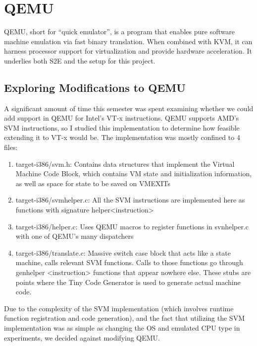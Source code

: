 \documentclass[11pt]{article}
\begin{document}
\section{QEMU}
QEMU, short for ``quick emulator'', is a program that enables pure software
machine emulation via fast binary translation. When combined with KVM, it can
harness processor support for virtualization and provide hardware
acceleration. It underlies both S2E and the setup for this project.
\subsection{Exploring Modifications to QEMU}
A significant amount of time this semester was spent examining whether we could
add support in QEMU for Intel's VT-x instructions. QEMU supports AMD's SVM
instructions, so I studied this implementation to determine how feasible
extending it to VT-x would be. The implementation was mostly confined to 4
files:
\begin{enumerate}
\item target-i386/svm.h: Contains data structures that implement the Virtual
Machine Code Block, which contains VM state and initialization information, as
well as space for state to be saved on VMEXITs
\item target-i386/svm\textunderscore helper.c: All the SVM instructions are implemented here as
functions with signature helper\textunderscore <instruction>
\item target-i386/helper.c: Uses QEMU macros to register functions in
svn\textunderscore helper.c with one of QEMU's many dispatchers
\item target-i386/translate.c: Massive switch case block that acts like a state
machine, calls relevant SVM functions. Calls to those functions go through
gen\textunderscore helper \textunderscore <instruction> functions that appear
nowhere else. These stubs are points where the Tiny Code Generator is used to
generate actual machine code. 
\end{enumerate}
Due to the complexity of the SVM implementation (which
involves runtime function registration and code generation), and the fact that
utilizing the SVM implementation was as simple as changing the OS and emulated
CPU type in experiments, we decided against modifying QEMU.
\end{document}
